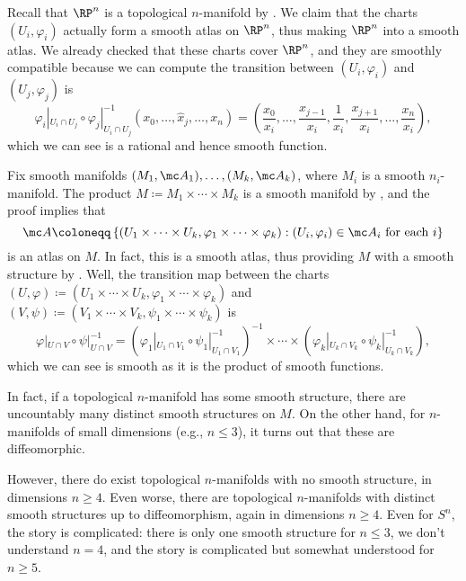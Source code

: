 \documentclass[../notes.tex]{subfiles}
\begin{document}
\begin{example}
	Recall that $\RP^n$ is a topological $n$-manifold by . We claim that the charts $(U_i,\varphi_i)$ actually form a smooth atlas on $\RP^n$, thus making $\RP^n$ into a smooth atlas. We already checked that these charts cover $\RP^n$, and they are smoothly compatible because we can compute the transition between $(U_i,\varphi_i)$ and $(U_j,\varphi_j)$ is
	\[\varphi_i|_{U_i\cap U_j}\circ\varphi_j|_{U_i\cap U_j}^{-1}(x_0,\ldots,\widehat x_j,\ldots,x_n)=\left(\frac{x_0}{x_i},\ldots,\frac{x_{j-1}}{x_i},\frac1{x_i},\frac{x_{j+1}}{x_i},\ldots,\frac{x_n}{x_i}\right),\]
	which we can see is a rational and hence smooth function.
\end{example}
\begin{example}
	Fix smooth manifolds $(M_1,\mc A_1),\ldots,(M_k,\mc A_k)$, where $M_i$ is a smooth $n_i$-manifold. The product $M\coloneqq M_1\times\cdots\times M_k$ is a smooth manifold by , and the proof implies that
	\[\mc A\coloneqq\left\{(U_1\times\cdots\times U_k,\varphi_1\times\cdots\times\varphi_k):(U_i,\varphi_i)\in\mc A_i\text{ for each }i\right\}\]
	is an atlas on $M$. In fact, this is a smooth atlas, thus providing $M$ with a smooth structure by . Well, the transition map between the charts $(U,\varphi)\coloneqq(U_1\times\cdots\times U_k,\varphi_1\times\cdots\times\varphi_k)$ and $(V,\psi)\coloneqq(V_1\times\cdots\times V_k,\psi_1\times\cdots\times\psi_k)$ is
	\[\varphi|_{U\cap V}\circ\psi|_{U\cap V}^{-1}=\left(\varphi_1|_{U_1\cap V_1}\circ\psi_1|_{U_1\cap V_1}^{-1}\right)^{-1}\times\cdots\times\left(\varphi_k|_{U_k\cap V_k}\circ\psi_k|_{U_k\cap V_k}^{-1}\right),\]
	which we can see is smooth as it is the product of smooth functions.
\end{example}
\begin{remark}
	In fact, if a topological $n$-manifold has some smooth structure, there are uncountably many distinct smooth structures on $M$. On the other hand, for $n$-manifolds of small dimensions (e.g., $n\le3$), it turns out that these are diffeomorphic.
\end{remark}
\begin{remark}
	However, there do exist topological $n$-manifolds with no smooth structure, in dimensions $n\ge4$. Even worse, there are topological $n$-manifolds with distinct smooth structures up to diffeomorphism, again in dimensions $n\ge4$. Even for $S^n$, the story is complicated: there is only one smooth structure for $n\le3$, we don't understand $n=4$, and the story is complicated but somewhat understood for $n\ge5$.
\end{remark}
\end{document}
